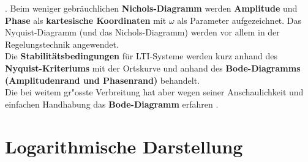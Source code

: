 \cite{UNB:81}.  Beim weniger gebr\"auchlichen {\bf
  Nichols-Diagramm}
werden {\bf Amplitude} und {\bf Phase}
als {\bf kartesische Koordinaten} mit $\omega$ als Parameter
aufgezeichnet.  Das Nyquist-Diagramm (und das Nichols-Diagramm) werden
vor allem in der Regelungstechnik angewendet.\\
Die {\bf Stabilit\"atsbedingungen} f\"ur LTI-Systeme werden kurz anhand des {\bf Nyquist-Kriteriums} mit der Ortskurve und anhand des {\bf Bode-Diagramms} {\bf (Amplitudenrand und Phasenrand)} behandelt.\\
Die bei weitem gr"osste Verbreitung hat aber wegen seiner
Anschaulichkeit und einfachen Handhabung das {\bf Bode-Diagramm}
erfahren \cite{WYR:99:2}.

\newpage
\section{Logarithmische Darstellung}
